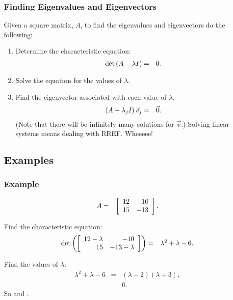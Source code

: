 \begin{frame}
  \frametitle{Finding Eigenvalues and Eigenvectors}

  Given a square matrix, $A$, to find the eigenvalues and eigenvectors do the following:
  \begin{enumerate}
  \item Determine the characteristic equation:
    \begin{eqnarray*}
      \det\left( A - \lambda I \right) & = & 0.
    \end{eqnarray*}
  \item Solve the equation for the values of $\lambda$.
  \item Find the eigenvector associated with each value of $\lambda$,
    \begin{eqnarray*}
      \left( A - \lambda_j I \right) \vec{v}_j & = & \vec{0}.
    \end{eqnarray*}
    (Note that there will be infinitely many solutions for $\vec{v}$.) Solving linear systems means dealing with RREF. Wheeeee!
  \end{enumerate}

\end{frame}

\subsection{Examples}

\begin{frame}
  \frametitle{Example}

  \begin{eqnarray*}
    A & = & \left[ \begin{array}{rr} 12 & -10 \\ 15 & -13 \end{array} \right].
  \end{eqnarray*}

  {
    Find the characteristic equation:
    \begin{eqnarray*}
      \det\left(\left[ \begin{array}{rr} 12-\lambda & -10 \\ 15 & -13-\lambda \end{array} \right]\right) & = & \lambda^2+\lambda-6.
    \end{eqnarray*}

    Find the values of $\lambda$:
    \begin{eqnarray*}
      \lambda^2+\lambda-6 & = & (\lambda-2)(\lambda+3), \\
      & = & 0.
    \end{eqnarray*}
    So  and .
  }

\end{frame}


